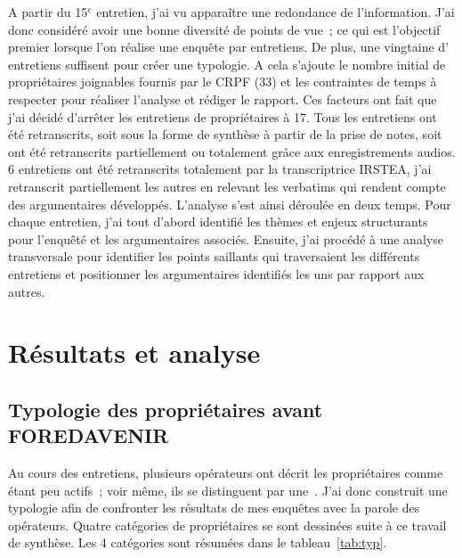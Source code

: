\documentclass[12pt]{report}
\newcounter{table1}
\begin{document}

A partir du 15$^{e}$ entretien, j'ai vu apparaître une redondance de
l'information. J'ai donc considéré avoir une bonne diversité de points de vue~;
ce qui est l'objectif premier lorsque l'on réalise une enquête par entretiens.
De plus, une vingtaine d' entretiens suffisent  pour créer une typologie. A cela s'ajoute le nombre initial de propriétaires
joignables fournis par le CRPF (33) et les contraintes de temps à respecter pour
réaliser l'analyse et rédiger le rapport. Ces facteurs ont fait que j'ai décidé
d’arrêter les entretiens de propriétaires à 17. Tous les entretiens ont été
retranscrits, soit sous la forme de synthèse à partir de la
prise de notes, soit ont été retranscrits partiellement ou totalement grâce aux
enregistrements audios. 6 entretiens ont été retranscrits totalement par la
transcriptrice IRSTEA, j'ai retranscrit partiellement les autres en relevant
les verbatims qui rendent compte des argumentaires développés. L'analyse s’est
ainsi déroulée en deux temps. Pour
chaque entretien, j’ai tout d’abord identifié les thèmes et enjeux structurants
pour l’enquêté et les argumentaires associés.  Ensuite, j’ai procédé à une
analyse transversale pour identifier les points saillants qui traversaient les
différents entretiens et positionner les argumentaires identifiés les uns par
rapport aux autres.


\chapter{Résultats et analyse}

\section{Typologie des propriétaires avant FOREDAVENIR}

Au cours des entretiens, plusieurs opérateurs ont décrit les propriétaires comme
étant peu actifs~; voir même, ils se distinguent par une~. J'ai donc construit une typologie afin de confronter les
résultats de mes enquêtes avec la parole des opérateurs. Quatre catégories de
propriétaires se sont dessinées suite à ce travail de synthèse. Les 4 catégories
sont résumées dans le tableau~\ref{tab:typ}.
\end{document}
